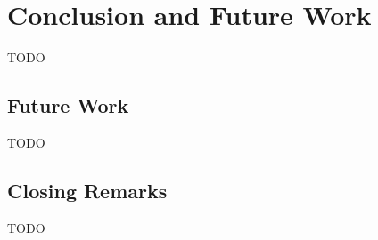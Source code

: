 \chapter{Conclusion and Future Work}
\label{cha:conclusion_and_future_work}

TODO

\section{Future Work}
\label{sec:future_work}

TODO


\section{Closing Remarks}
\label{sec:closing_remarks}

TODO

